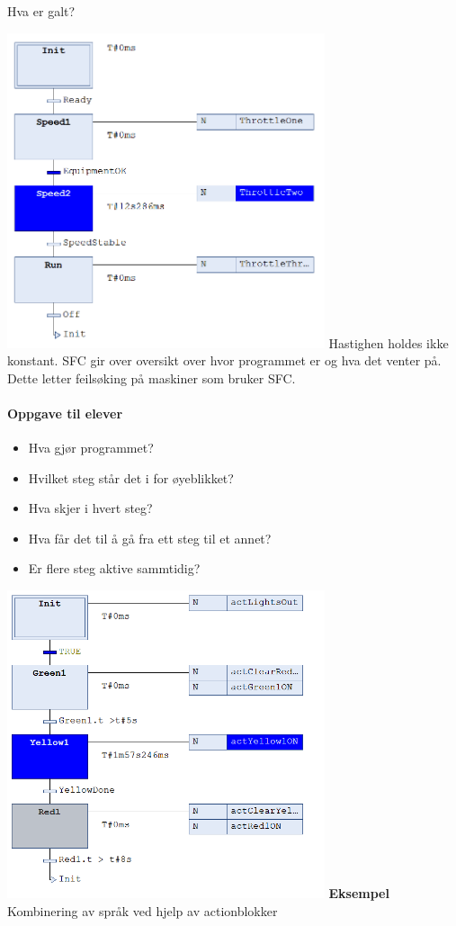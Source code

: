 \vskip 2.5pt 
Hva er galt? 
\vskip 2.5pt 

\includegraphics[width=0.7\textwidth]{SFC_stoppet_maskin.png}
\vskip 2.5pt 
Hastighen holdes ikke konstant. 
\vskip 2.5pt 
SFC gir over oversikt over hvor programmet er og hva det venter på. Dette letter feilsøking på maskiner som bruker SFC. 
\vfill\eject
\paragraph{Oppgave til elever}

\begin{itemize}
	\item Hva gjør programmet?
	\item Hvilket steg står det i for øyeblikket?
	\item Hva skjer i hvert steg?
	\item Hva får det til å gå fra ett steg til et annet?
	\item Er flere steg aktive sammtidig?
\end{itemize}

\includegraphics[width=0.7\textwidth]{SFC_EnkeltTrefikkLys.png}
\vskip 2.5pt 
\vfill\eject
\textbf{Eksempel}
\vskip 2.5pt 
Kombinering av språk ved hjelp av actionblokker


